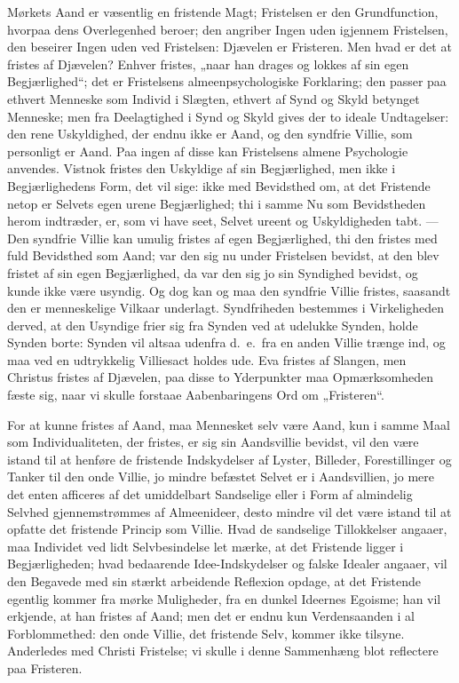 \documentclass[12pt]{book}
\begin{document}
Mørkets Aand er væsentlig en fristende Magt; Fristelsen er den
Grundfunction, hvorpaa dens Overlegenhed beroer; den angriber Ingen
uden igjennem Fristelsen, den beseirer Ingen uden ved Fristelsen:
Djævelen er Fristeren. Men hvad er det at fristes af Djævelen?
Enhver fristes, „naar han drages og lokkes af sin egen
Begjærlighed“; det er Fristelsens almeenpsychologiske Forklaring;
den passer paa ethvert Menneske som Individ i Slægten, ethvert af
Synd og Skyld betynget Menneske; men fra Deelagtighed i Synd og
Skyld gives der to ideale Undtagelser: den rene Uskyldighed, der
endnu ikke er Aand, og den syndfrie Villie, som personligt er Aand.
Paa ingen af disse kan Fristelsens almene Psychologie anvendes.
Vistnok fristes den Uskyldige af sin Begjærlighed, men ikke i
Begjærlighedens Form, det vil sige: ikke med Bevidsthed om, at det
Fristende netop er Selvets egen urene Begjærlighed; thi i samme Nu
som Bevidstheden herom indtræder, er, som vi have seet, Selvet
ureent og Uskyldigheden tabt. --- Den syndfrie Villie kan umulig
fristes af egen Begjærlighed, thi den fristes med fuld Bevidsthed
som Aand; var den sig nu under Fristelsen bevidst, at den blev
fristet af sin egen Begjærlighed, da var den sig jo sin Syndighed
bevidst, og kunde ikke være usyndig. Og dog kan og maa den syndfrie
Villie fristes, saasandt den er menneskelige Vilkaar underlagt.
Syndfriheden bestemmes i Virkeligheden derved, at den Usyndige frier
sig fra Synden ved at udelukke Synden, holde Synden borte: Synden
vil altsaa udenfra d.\ e.\ fra en anden Villie trænge ind, og maa
ved en udtrykkelig Villiesact holdes ude. Eva fristes af Slangen,
men Christus fristes af Djævelen, paa disse to Yderpunkter maa
Opmærksomheden fæste sig, naar vi skulle forstaae Aabenbaringens Ord
om „Fristeren“.

For at kunne fristes af Aand, maa Mennesket selv være Aand, kun i
samme Maal som Individualiteten, der
fristes, er sig sin Aandsvillie bevidst, vil den være istand til at
henføre de fristende Indskydelser af Lyster, Billeder, Forestillinger
og Tanker til den onde Villie, jo mindre befæstet Selvet er i
Aandsvillien, jo mere det enten afficeres af det umiddelbart
Sandselige eller i Form af almindelig Selvhed gjennemstrømmes af
Almeenideer, desto mindre vil det være istand til at opfatte det
fristende Princip som Villie. Hvad de sandselige Tillokkelser
angaaer, maa Individet ved lidt Selvbesindelse let mærke, at det
Fristende ligger i Begjærligheden; hvad bedaarende Idee-Indskydelser
og falske Idealer angaaer, vil den Begavede med sin stærkt
arbeidende Reflexion opdage, at det Fristende egentlig kommer fra
mørke Muligheder, fra en dunkel Ideernes Egoisme; han vil erkjende,
at han fristes af Aand; men det er endnu kun Verdensaanden i al
Forblommethed: den onde Villie, det fristende Selv, kommer ikke
tilsyne. Anderledes med Christi Fristelse; vi skulle i denne
Sammenhæng blot reflectere paa Fristeren.
\end{document}
